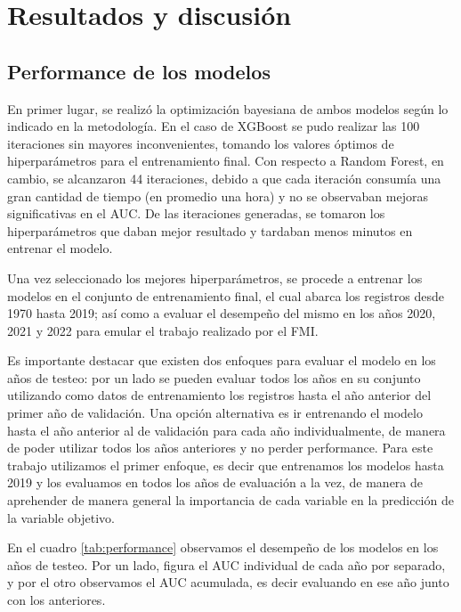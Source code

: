 \documentclass{article}
\begin{document}
\section{Resultados y discusión}

\subsection{Performance de los modelos}
En primer lugar, se realizó la optimización bayesiana de ambos modelos según lo indicado
en la metodología. En el caso de XGBoost se pudo realizar las 100 iteraciones sin mayores
inconvenientes, tomando los valores óptimos de hiperparámetros para el entrenamiento 
final. Con respecto a Random Forest, en cambio, se alcanzaron 44 iteraciones, debido a que cada
iteración consumía una gran cantidad de tiempo (en promedio una hora) y no se observaban
mejoras significativas en el AUC. De las iteraciones generadas, se tomaron los hiperparámetros
que daban mejor resultado y tardaban menos minutos en entrenar el modelo.

Una vez seleccionado los mejores hiperparámetros, se procede a entrenar los modelos en el
conjunto de entrenamiento final, el cual abarca los registros desde 1970 hasta 2019; así
como a evaluar el desempeño del mismo en los años 2020, 2021 y 2022 para emular el trabajo
realizado por el FMI.

Es importante destacar que existen dos enfoques para evaluar el modelo en los años de
testeo: por un lado se pueden evaluar todos los años en su conjunto utilizando como datos
de entrenamiento los registros hasta el año anterior del primer año de validación. Una
opción alternativa es ir entrenando el modelo hasta el año anterior al de validación para
cada año individualmente, de manera de poder utilizar todos los años anteriores y no 
perder performance. Para este trabajo utilizamos el primer enfoque, es decir que entrenamos los 
modelos hasta 2019 y los evaluamos en todos los años de evaluación a la vez, de manera de
aprehender de manera general la importancia de cada variable en la predicción de la
variable objetivo.

En el cuadro \ref{tab:performance} observamos el desempeño de los modelos en los años
de testeo. Por un lado, figura el AUC individual de cada año por separado, y por el otro
observamos el AUC acumulada, es decir evaluando en ese año junto con los anteriores.
\end{document}
